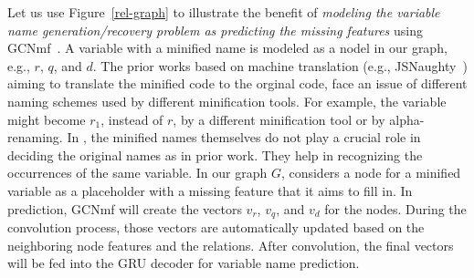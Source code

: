 Let us use Figure~\ref{rel-graph} to illustrate the benefit of {\em
modeling the variable name generation/recovery problem as predicting
the missing features} using GCNmf~\cite{GCNmf}. A variable with a
minified name is modeled as a nodel in our graph, e.g., $r$, $q$, and
$d$.  The prior works based on machine translation (e.g.,
JSNaughty~\cite{JSNaughty2017}) aiming to translate the minified code
to the orginal code, face an issue of different naming schemes used
by different minification tools. For example, the
variable  might become $r_1$, instead of $r$, by a
different minification tool or by alpha-renaming. In {\tool}, the
minified names themselves do not play a crucial role in deciding the
original names as in prior work. They help in recognizing the
occurrences of the same variable. In our graph $G$, {\tool}
considers a node for a minified variable as a placeholder with a
missing feature that it aims to fill in.  In prediction, GCNmf will
create the vectors $v_r$, $v_q$, and $v_d$ for the nodes. During the
convolution process, those vectors are automatically updated based on
the neighboring node features and the relations. After convolution,
the final vectors will be fed into the GRU decoder for variable name
prediction.



